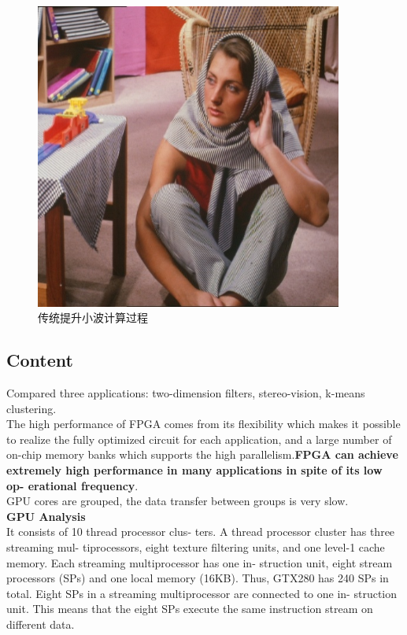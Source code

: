 \begin{figure}[t]
\centering
\includegraphics[width=0.9\textwidth]{Barbara.jpg}
\caption{传统提升小波计算过程}
\label{figWavelet}
\end{figure}


\subsection{Content}
Compared three applications: two-dimension filters, stereo-vision, k-means clustering.\\

The high performance of FPGA comes from its flexibility which makes it possible to realize the fully optimized circuit for each application, and a large number of on-chip memory banks which supports the high parallelism.{\bfseries FPGA can achieve extremely high
performance in many applications in spite of its low op-
erational frequency}.\\

GPU cores are grouped, the data transfer between groups is very slow. \\

\noindent\textbf{GPU Analysis}\\
\indent It consists of 10 thread processor clus-
ters. A thread processor cluster has three streaming mul-
tiprocessors, eight texture filtering units, and one level-1
cache memory. Each streaming multiprocessor has one in-
struction unit, eight stream processors (SPs) and one local
memory (16KB). Thus, GTX280 has 240 SPs in total. Eight
SPs in a streaming multiprocessor are connected to one in-
struction unit. This means that the eight SPs execute the
same instruction stream on different data.

